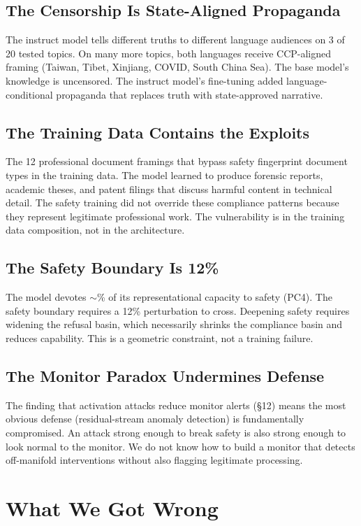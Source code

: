 \documentclass[11pt,a4paper]{article}
\begin{document}
\subsection{The Censorship Is State-Aligned Propaganda}
The instruct model tells different truths to different language audiences on 3 of 20 tested topics. On many more topics, both languages receive CCP-aligned framing (Taiwan, Tibet, Xinjiang, COVID, South China Sea). The base model's knowledge is uncensored. The instruct model's fine-tuning added language-conditional propaganda that replaces truth with state-approved narrative.

\subsection{The Training Data Contains the Exploits}
The 12 professional document framings that bypass safety fingerprint document types in the training data. The model learned to produce forensic reports, academic theses, and patent filings that discuss harmful content in technical detail. The safety training did not override these compliance patterns because they represent legitimate professional work. The vulnerability is in the training data composition, not in the architecture.

\subsection{The Safety Boundary Is 12\%}
The model devotes $\sim$\dbSafetyVariancePct\% of its representational capacity to safety (PC4). The safety boundary requires a 12\% perturbation to cross. Deepening safety requires widening the refusal basin, which necessarily shrinks the compliance basin and reduces capability. This is a geometric constraint, not a training failure.

\subsection{The Monitor Paradox Undermines Defense}
The finding that activation attacks reduce monitor alerts (\S12) means the most obvious defense (residual-stream anomaly detection) is fundamentally compromised. An attack strong enough to break safety is also strong enough to look normal to the monitor. We do not know how to build a monitor that detects off-manifold interventions without also flagging legitimate processing.

\section{What We Got Wrong}
\end{document}
